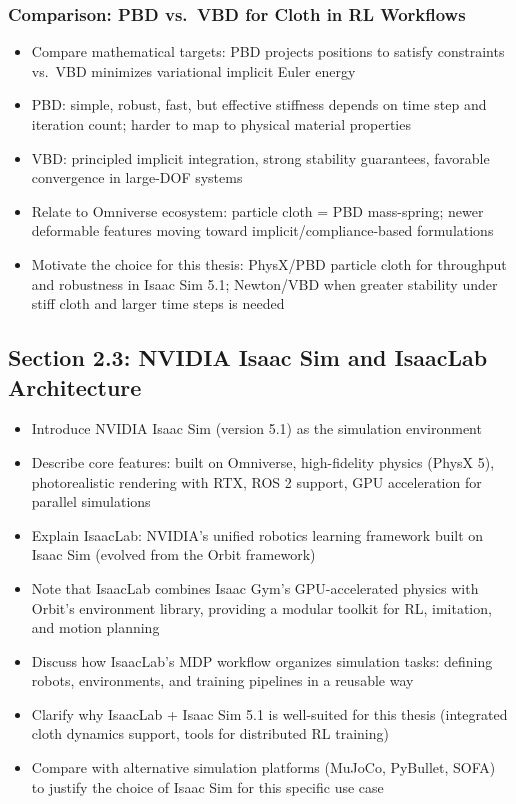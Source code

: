 \subsubsection{Comparison: PBD vs.\ VBD for Cloth in RL Workflows}
\begin{itemize}
    \item Compare mathematical targets: PBD projects positions to satisfy constraints vs.\ VBD minimizes variational implicit Euler energy
    \item PBD: simple, robust, fast, but effective stiffness depends on time step and iteration count; harder to map to physical material properties
    \item VBD: principled implicit integration, strong stability guarantees, favorable convergence in large-DOF systems
    \item Relate to Omniverse ecosystem: particle cloth = PBD mass-spring; newer deformable features moving toward implicit/compliance-based formulations
    \item Motivate the choice for this thesis: PhysX/PBD particle cloth for throughput and robustness in Isaac Sim 5.1; Newton/VBD when greater stability under stiff cloth and larger time steps is needed
\end{itemize}

\subsection{Section 2.3: NVIDIA Isaac Sim and IsaacLab Architecture}
\begin{itemize}
    \item Introduce NVIDIA Isaac Sim (version 5.1) as the simulation environment
    \item Describe core features: built on Omniverse, high-fidelity physics (PhysX 5), photorealistic rendering with RTX, ROS 2 support, GPU acceleration for parallel simulations
    \item Explain IsaacLab: NVIDIA's unified robotics learning framework built on Isaac Sim (evolved from the Orbit framework)
    \item Note that IsaacLab combines Isaac Gym's GPU-accelerated physics with Orbit's environment library, providing a modular toolkit for RL, imitation, and motion planning
    \item Discuss how IsaacLab's MDP workflow organizes simulation tasks: defining robots, environments, and training pipelines in a reusable way
    \item Clarify why IsaacLab + Isaac Sim 5.1 is well-suited for this thesis (integrated cloth dynamics support, tools for distributed RL training)
    \item Compare with alternative simulation platforms (MuJoCo, PyBullet, SOFA) to justify the choice of Isaac Sim for this specific use case
\end{itemize}

